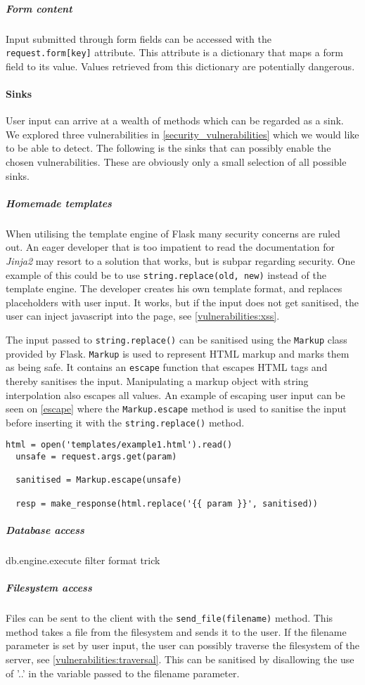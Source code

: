 \subparagraph{Form content}
Input submitted through form fields can be accessed with the \texttt{request.form[key]} attribute.
This attribute is a dictionary that maps a form field to its value.
Values retrieved from this dictionary are potentially dangerous.

\paragraph{Sinks}
User input can arrive at a wealth of methods which can be regarded as a sink.
We explored three vulnerabilities in \cref{security_vulnerabilities} which we would like to be able to detect.
The following is the sinks that can possibly enable the chosen vulnerabilities.
These are obviously only a small selection of all possible sinks.

\subparagraph{Homemade templates}
When utilising the template engine of Flask many security concerns are ruled out.
An eager developer that is too impatient to read the documentation for \emph{Jinja2} may resort to a solution that works, but is subpar regarding security.
One example of this could be to use \texttt{string.replace(old, new)} instead of the template engine.
The developer creates his own template format, and replaces placeholders with user input.
It works, but if the input does not get sanitised, the user can inject javascript into the page, see \cref{vulnerabilities:xss}.

The input passed to \texttt{string.replace()} can be sanitised using the \texttt{Markup} class provided by Flask.
\texttt{Markup} is used to represent HTML markup and marks them as being safe.
It contains an \texttt{escape} function that escapes HTML tags and thereby sanitises the input.
Manipulating a markup object with string interpolation also escapes all values.
An example of escaping user input can be seen on \cref{escape} where the \texttt{Markup.escape} method is used to sanitise the input before inserting it with the \texttt{string.replace()} method.

\begin{lstlisting}[style=python, caption={An example of escaping user input}, label={escape}]
  html = open('templates/example1.html').read()
  unsafe = request.args.get(param)

  sanitised = Markup.escape(unsafe)
  
  resp = make_response(html.replace('{{ param }}', sanitised))
\end{lstlisting}


\subparagraph{Database access}
db.engine.execute filter format trick

\subparagraph{Filesystem access}
Files can be sent to the client with the \texttt{send\_file(filename)} method.
This method takes a file from the filesystem and sends it to the user.
If the filename parameter is set by user input, the user can possibly traverse the filesystem of the server, see \cref{vulnerabilities:traversal}.
This can be sanitised by disallowing the use of '..' in the variable passed to the filename parameter.
